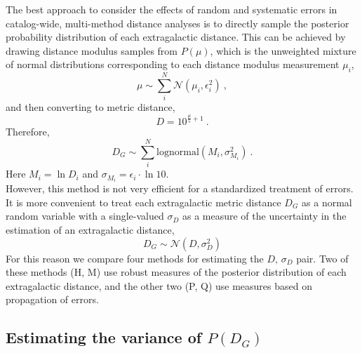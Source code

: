 \documentclass[a4paper,fleqn,usenatbib]{mnras}
\begin{document}
The best approach to consider the effects of random and systematic errors in catalog-wide, multi-method distance analyses is to directly sample the posterior probability distribution of each extragalactic distance. This can be achieved by drawing distance modulus samples from $P(\mu)$, which is the unweighted mixture of normal distributions corresponding to each distance modulus measurement $\mu_i$,
\[\mu\sim\sum_i^N \mathcal{N}(\mu_i,\epsilon_i^2)\ ,\]
and then converting to metric distance,
\[D=10^{\frac{\mu}{5}+1}\ .\]
Therefore,
\[D_G\sim\sum_i^N\mathrm{lognormal}(M_i,\sigma_{M_i}^2)\ .\]
Here $M_i=\ln D_i$ and $\sigma_{M_i}=\epsilon_i\cdot\ln10$.\\

However, this method is not very efficient for a standardized treatment of errors. It is more convenient to treat each extragalactic metric distance $D_G$ as a normal random variable with a single-valued $\sigma_D$ as a measure of the uncertainty in the estimation of an extragalactic distance,
\[D_G\sim \mathcal{N}(D,\sigma_D^2)\]
For this reason we compare four methods for estimating the $D,\,\sigma_D$ pair. Two of these methods (H, M) use robust measures of the posterior distribution of each extragalactic distance, and the other two (P, Q) use measures based on propagation of errors.

\subsection{Estimating the variance of $P(D_G)$}
\label{sec:meth} 
\end{document}

